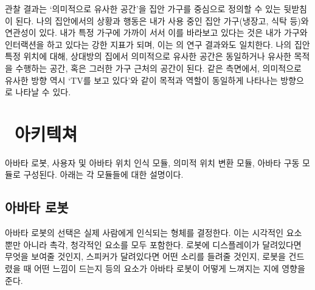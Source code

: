 관찰 결과는 `의미적으로 유사한 공간'을 집안 가구를 중심으로 정의할 수 있는 뒷받침이 된다. 나의 집안에서의 상황과 행동은 내가 사용 중인 집안 가구(냉장고, 식탁 등)와 연관성이 있다. 내가 특정 가구에 가까이 서서 이를 바라보고 있다는 것은 내가 가구와 인터랙션을 하고 있다는 강한 지표가 되며, 이는 \cite{philipose2004inferring}의 연구 결과와도 일치한다. 나의 집안 특정 위치에 대해, 상대방의 집에서 의미적으로 유사한 공간은 동일하거나 유사한 목적을 수행하는 공간, 혹은 그러한 가구 근처의 공간이 된다. 같은 측면에서, 의미적으로 유사한 방향 역시 `TV를 보고 있다'와 같이 목적과 역할이 동일하게 나타나는 방향으로 나타날 수 있다.


\section{\sysname\ 아키텍쳐}

\sysname\은 아바타 로봇, 사용자 및 아바타 위치 인식 모듈, 의미적 위치 변환 모듈, 아바타 구동 모듈로 구성된다.  아래는 각 모듈들에 대한 설명이다.




\subsection{아바타 로봇}
아바타 로봇의 선택은 실제 사람에게 인식되는 형체를 결정한다. 이는 시각적인 요소 뿐만 아니라 촉각, 청각적인 요소를 모두 포함한다. 로봇에 디스플레이가 달려있다면 무엇을 보여줄 것인지, 스피커가 달려있다면 어떤 소리를 들려줄 것인지, 로봇을 건드렸을 때 어떤 느낌이 드는지 등의 요소가 아바타 로봇이 어떻게 느껴지는 지에 영향을 준다.

